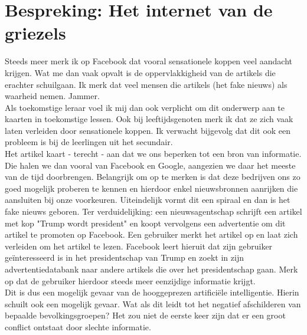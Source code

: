 \documentclass[11pt]{article}
\author{Jasper De Valck}
\begin{document}
\section*{Bespreking: Het internet van de griezels}
Steeds meer merk ik op Facebook dat vooral sensationele koppen veel aandacht krijgen. Wat me dan vaak opvalt is de oppervlakkigheid van de artikels die erachter schuilgaan.
Ik merk dat veel mensen die artikels (het fake nieuws) als waarheid nemen. Jammer.\\

Als toekomstige leraar voel ik mij dan ook verplicht om dit onderwerp aan te kaarten in toekomstige lessen. Ook bij leeftijdsgenoten merk ik dat ze zich vaak laten verleiden door sensationele koppen. Ik verwacht bijgevolg dat dit ook een probleem is bij de leerlingen uit het secundair.\\

Het artikel kaart - terecht - aan dat we ons beperken tot een bron van informatie. Die halen we dan vooral van Facebook en Google, aangezien we daar het meeste van de tijd doorbrengen. Belangrijk om op te merken is dat deze bedrijven ons zo goed mogelijk proberen te kennen en hierdoor enkel nieuwsbronnen aanrijken die aansluiten bij onze voorkeuren. Uiteindelijk vormt dit een spiraal en dan is het fake nieuws geboren. Ter verduidelijking: een nieuwsagentschap schrijft een artikel met kop "Trump wordt president" en koopt vervolgens een advertentie om dit artikel te promoten op Facebook.
Een gebruiker merkt het artikel op en laat zich verleiden om het artikel te lezen. Facebook leert hieruit dat zijn gebruiker ge\"{i}nteresseerd is in het presidentschap van Trump en zoekt in zijn advertentiedatabank naar andere artikels die over het presidentschap gaan. Merk op dat de gebruiker hierdoor steeds meer eenzijdige informatie krijgt.\\

Dit is dus een mogelijk gevaar van de hooggeprezen artifici\"{e}le intelligentie. Hierin schuilt ook een mogelijk gevaar. Wat als dit leidt tot het negatief afschilderen van bepaalde bevolkingsgroepen? Het zou niet de eerste keer zijn dat er een groot conflict ontstaat door slechte informatie.
\end{document}
